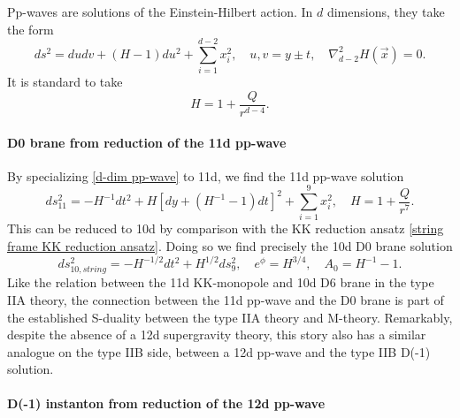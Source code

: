 Pp-waves are solutions of the Einstein-Hilbert action.
In $d$ dimensions, they take the form
\begin{equation}
ds^2 = dudv+(H-1)du^2+\sum_{i=1}^{d-2}x_i^2,\quad
u,v = y\pm t,\quad
\nabla^2_{d-2} H(\vec{x})=0.
\label{d-dim pp-wave}
\end{equation}
It is standard to take
\begin{equation}
H=1+\frac{Q}{r^{d-4}}.
\end{equation}

\paragraph{D0 brane from reduction of the 11d pp-wave}
By specializing \eqref{d-dim pp-wave} to 11d, we find the 11d pp-wave solution
\begin{equation}
ds_{11}^2
=
-H^{-1}dt^2+H[dy+(H^{-1}-1)dt]^2
+\sum_{i=1}^9x_i^2,\quad
H=1+\frac{Q}{r^7}.
\end{equation}
This can be reduced to 10d by comparison with the KK reduction ansatz \eqref{string frame KK reduction ansatz}.
Doing so we find precisely the 10d D0 brane solution \cite{Stelle:1998xg}
\begin{equation}
ds_{10,string}^2
=-H^{-1/2} dt^2+H^{1/2}ds_9^2,\quad
e^{\phi} = H^{3/4},\quad
A_0 = H^{-1}-1.
\end{equation}
Like the relation between the 11d KK-monopole and 10d D6 brane in the type IIA theory, the connection between the 11d pp-wave and the D0 brane is part of the established S-duality between the type IIA theory and M-theory. Remarkably, despite the absence of a 12d supergravity theory, this story also has a similar analogue on the type IIB side, between a 12d pp-wave and the type IIB D(-1) solution.


\paragraph{D(-1) instanton from reduction of the 12d pp-wave}

